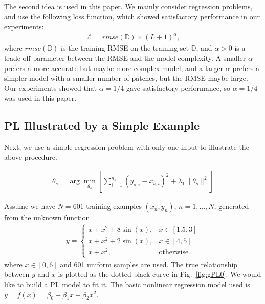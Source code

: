 \documentclass[journal,twocolumn]{IEEEtran}
\begin{document}
The second idea is used in this paper. We mainly consider regression problems, and use the following loss function, which showed satisfactory performance in our experiments:
\begin{align}
\ell= rmse(\mathbb{D})\times (L+1)^\alpha, \label{eq:loss}
\end{align}
where $rmse(\mathbb{D})$ is the training RMSE on the training set $\mathbb{D}$, and $\alpha>0$ is a trade-off parameter between the RMSE and the model complexity. A smaller $\alpha$ prefers a more accurate but maybe more complex model, and a larger $\alpha$ prefers a simpler model with a smaller number of patches, but the RMSE maybe large. Our experiments showed that $\alpha=1/4$ gave satisfactory performance, so $\alpha=1/4$ was used in this paper.

\subsection{PL Illustrated by a Simple Example}

Next, we use a simple regression problem with only one input to illustrate the above procedure.

\begin{align}
\theta_s=\arg\min_{\theta_s}\left[\sum_{i=1}^{n_s}(y_{s,i}-x_{s,i})^2+\lambda_1\|\theta_s\|^2\right]
\end{align}

Assume we have $N=601$ training examples $(x_n,y_n)$, $n=1,...,N$, generated from the unknown function
\begin{align}
y=\left\{\begin{array}{ll}
           x+x^2+8\sin(x), & x\in[1.5,3] \\
           x+x^2+2\sin(x), & x\in[4,5] \\
           x+x^2, & \mbox{otherwise}
         \end{array}\right. \label{eq:g}
\end{align}
where $x\in[0,6]$ and 601 uniform samples are used. The true relationship between $y$ and $x$ is plotted as the dotted black curve in Fig.~\ref{fig:gPL0}. We would like to build a PL model to fit it. The basic nonlinear regression model used is $y=f(x)=\beta_0+\beta_1x+\beta_2x^2$.
\end{document}
